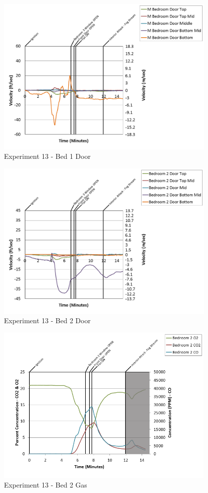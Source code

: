 \documentclass{article}
\begin{document}
\begin{appendices}
\clearpage

\begin{figure}[h!]
	\centering
	\includegraphics[height=3.05in]{0_Images/Results_Charts/Exp_13_Charts/Bed1Door.png}
	\caption{Experiment 13 - Bed 1 Door}
\end{figure}


\begin{figure}[h!]
	\centering
	\includegraphics[height=3.05in]{0_Images/Results_Charts/Exp_13_Charts/Bed2Door.png}
	\caption{Experiment 13 - Bed 2 Door}
\end{figure}

\clearpage

\begin{figure}[h!]
	\centering
	\includegraphics[height=3.05in]{0_Images/Results_Charts/Exp_13_Charts/Bed2Gas.png}
	\caption{Experiment 13 - Bed 2 Gas}
\end{figure}



\end{appendices}
\end{document}
